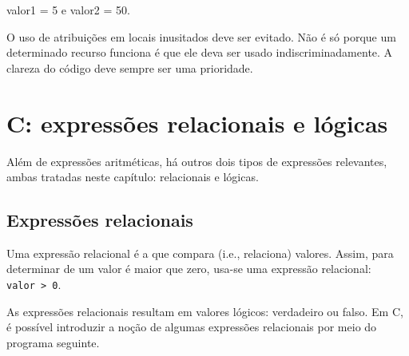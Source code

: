 \documentclass[
  11pt,
  a4paper,
]{scrbook}
\newenvironment{Shaded}{\begin{snugshade}}{\end{snugshade}}
\newcommand{\NormalTok}[1]{#1}
\begin{document}
\begin{Shaded}
\begin{Highlighting}[]
\NormalTok{valor1 = 5 e valor2 = 50.}
\end{Highlighting}
\end{Shaded}

\begin{tcolorbox}[enhanced jigsaw, arc=.35mm, bottomtitle=1mm, colbacktitle=quarto-callout-tip-color!10!white, title=\textcolor{quarto-callout-tip-color}{\faLightbulb}\hspace{0.5em}{Dica}, toprule=.15mm, left=2mm, opacityback=0, colback=white, colframe=quarto-callout-tip-color-frame, opacitybacktitle=0.6, bottomrule=.15mm, leftrule=.75mm, toptitle=1mm, coltitle=black, titlerule=0mm, rightrule=.15mm, breakable]

O uso de atribuições em locais inusitados deve ser evitado. Não é só
porque um determinado recurso funciona é que ele deva ser usado
indiscriminadamente. A clareza do código deve sempre ser uma prioridade.

\end{tcolorbox}

\chapter{C: expressões relacionais e
lógicas}\label{c-expressuxf5es-relacionais-e-luxf3gicas}

Além de expressões aritméticas, há outros dois tipos de expressões
relevantes, ambas tratadas neste capítulo: relacionais e lógicas.

\section{Expressões relacionais}\label{expressuxf5es-relacionais}

Uma expressão relacional é a que compara (i.e., relaciona) valores.
Assim, para determinar de um valor é maior que zero, usa-se uma
expressão relacional: \texttt{valor\ \textgreater{}\ 0}.

As expressões relacionais resultam em valores lógicos: verdadeiro ou
falso. Em C, é possível introduzir a noção de algumas expressões
relacionais por meio do programa seguinte.
\end{document}
